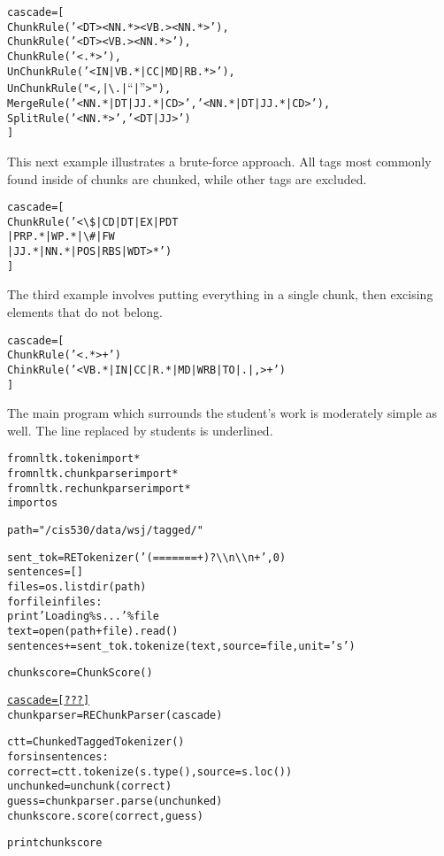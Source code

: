 \documentclass[11pt]{article}
\newenvironment{sv}{\scriptsize\begin{alltt}}{\end{alltt}\normalsize}
\begin{document}
\begin{sv}
cascade = [
  ChunkRule('<DT><NN.*><VB.><NN.*>'),
  ChunkRule('<DT><VB.><NN.*>'),
  ChunkRule('<.*>'),
  UnChunkRule('<IN|VB.*|CC|MD|RB.*>'),
  UnChunkRule("<,|{\textbackslash}.|``|''>"),
  MergeRule('<NN.*|DT|JJ.*|CD>', '<NN.*|DT|JJ.*|CD>'),
  SplitRule('<NN.*>', '<DT|JJ>')
]
\end{sv}

This next example illustrates a brute-force approach.  All tags most
commonly found inside of chunks are chunked, while other tags are excluded.

\begin{sv}
cascade = [
  ChunkRule('<{\textbackslash}\$|CD|DT|EX|PDT
             |PRP.*|WP.*|{\textbackslash}\#|FW
             |JJ.*|NN.*|POS|RBS|WDT>*')
]
\end{sv}

The third example involves putting everything in a single chunk,
then excising elements that do not belong.

\begin{sv}
cascade = [
  ChunkRule('<.*>+')
  ChinkRule('<VB.*|IN|CC|R.*|MD|WRB|TO|.|,>+')
]
\end{sv}

The main program which surrounds the student's work is moderately
simple as well.  The line replaced by students is underlined.
\begin{sv}
from nltk.token import *
from nltk.chunkparser import *
from nltk.rechunkparser import *
import os

path = "/cis530/data/wsj/tagged/"

sent_tok = RETokenizer('(=======+)?{\textbackslash}{\textbackslash}n{\textbackslash}{\textbackslash}n+', 0)
sentences = []
files = os.listdir(path)
for file in files:
    print 'Loading \%s...' \% file
    text = open(path+file).read()
    sentences += sent_tok.tokenize(text, source=file, unit='s')

chunkscore = ChunkScore()

\underline{cascade = [ ??? ]}
chunkparser = REChunkParser(cascade)

ctt = ChunkedTaggedTokenizer()
for s in sentences:
    correct = ctt.tokenize(s.type(), source=s.loc())
    unchunked = unchunk(correct)
    guess = chunkparser.parse(unchunked)
    chunkscore.score(correct, guess)

print chunkscore
\end{sv}
\end{document}
